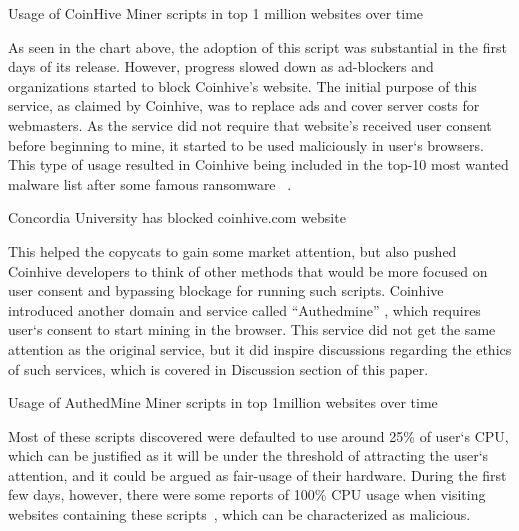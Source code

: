\vspace*{-1mm}
\begin{center}
	\caption{Usage of CoinHive Miner scripts in top 1 million websites over time}
\end{center}
\vspace*{-2mm}

As seen in the chart above, the adoption of this script was substantial in the first days of its release. However, progress slowed down as ad-blockers and organizations started to block Coinhive's website. The initial purpose of this service, as claimed by Coinhive, was to replace ads and cover server costs for webmasters. As the service did not require that website's received user consent before beginning to mine, it started to be used maliciously in user`s browsers. This type of usage resulted in Coinhive being included in the top-10 most wanted malware list after some famous ransomware ~\cite{checkpoint}. 

\vspace*{-3mm}
\begin{center}
	\caption{Concordia University has blocked coinhive.com website}
\end{center}
\vspace*{-2mm}

This helped the copycats to gain some market attention, but also pushed Coinhive developers to think of other methods that would be more focused on user consent and bypassing blockage for running such scripts. Coinhive introduced another domain and service called ``Authedmine'' , which requires user`s consent to start mining in the browser. This service did not get the same attention as the original service, but it did inspire discussions regarding the ethics of such services, which is covered in Discussion section of this paper. 
\vspace*{-1mm}
\begin{center}
	\caption{Usage of AuthedMine Miner scripts in top 1million websites over time}
\end{center}
\vspace*{-1mm}

Most of these scripts discovered were defaulted to use around 25\% of user`s CPU, which can be justified as it will be under the threshold of attracting the user`s attention, and it could be argued as fair-usage of their hardware. During the first few days, however, there were some reports of 100\% CPU usage when visiting websites containing these scripts~\cite{piratesbayblog}, which can be characterized as malicious.

